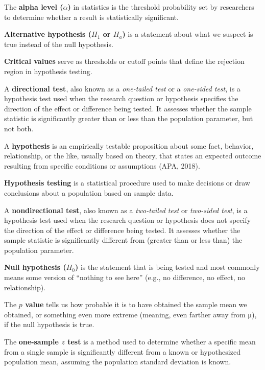 \documentclass[
  letterpaper,
  DIV=11,
  numbers=noendperiod]{scrreprt}
\begin{document}

The \textbf{alpha level (\(\alpha\))} in statistics is the threshold
probability set by researchers to determine whether a result is
statistically significant.

\textbf{Alternative hypothesis (\(H_1\) or \(H_a\))} is a statement
about what we suspect is true instead of the null hypothesis.

\textbf{Critical values} serve as thresholds or cutoff points that
define the rejection region in hypothesis testing.

A \textbf{directional test}, also known as a \emph{one-tailed test} or a
\emph{one-sided test}, is a hypothesis test used when the research
question or hypothesis specifies the direction of the effect or
difference being tested. It assesses whether the sample statistic is
significantly greater than or less than the population parameter, but
not both.

A \textbf{hypothesis} is an empirically testable proposition about some
fact, behavior, relationship, or the like, usually based on theory, that
states an expected outcome resulting from specific conditions or
assumptions (APA, 2018).

\textbf{Hypothesis testing} is a statistical procedure used to make
decisions or draw conclusions about a population based on sample data.

A \textbf{nondirectional test}, also known as a \emph{two-tailed test}
or \emph{two-sided test}, is a hypothesis test used when the research
question or hypothesis does not specify the direction of the effect or
difference being tested. It assesses whether the sample statistic is
significantly different from (greater than or less than) the population
parameter.

\textbf{Null hypothesis (\(H_0\))} is the statement that is being tested
and most commonly means some version of ``nothing to see here'' (e.g.,
no difference, no effect, no relationship).

The \textbf{\(p\) value} tells us how probable it is to have obtained
the sample mean we obtained, or something even more extreme (meaning,
even farther away from μ), if the null hypothesis is true.

The \textbf{one-sample \(z\) test} is a method used to determine whether
a specific mean from a single sample is significantly different from a
known or hypothesized population mean, assuming the population standard
deviation is known.
\end{document}
